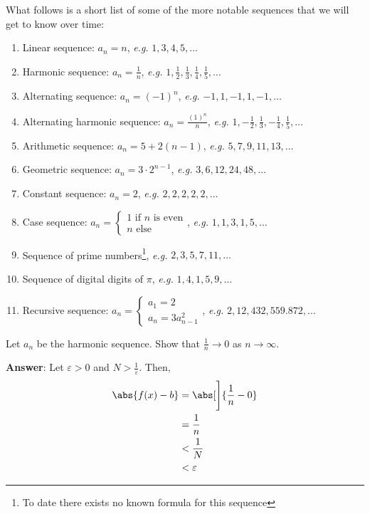 \begin{rem}\label{rem-remarkable-sequences}
	What follows is a short list of some of the more notable sequences that we will
	get to know over time:
	\begin{enumerate}
		\item Linear sequence: $a_n=n$, \textit{e.g.} $1,3,4,5,\dots$
		\item Harmonic sequence: $a_n=\tfrac{1}{n}$, \textit{e.g.} $1,\tfrac{1}{2},\tfrac{1}{3},\tfrac{1}{4},\tfrac{1}{5},\dots$
		\item Alternating sequence: $a_n=(-1)^n$, \textit{e.g.} $-1,1,-1,1,-1,\dots$
		\item Alternating harmonic sequence: $a_n=\tfrac{(1)^{n}}{n}$, \textit{e.g.} $1,-\tfrac{1}{2},\tfrac{1}{3},-\tfrac{1}{4},\tfrac{1}{5},\dots$
		\item Arithmetic sequence: $a_n=5+2(n-1)$, \textit{e.g.} $5,7,9,11,13,\dots$
		\item Geometric sequence: $a_n=3\cdot2^{n-1}$, \textit{e.g.} $3,6,12,24,48,\dots$
		\item Constant sequence: $a_n=2$, \textit{e.g.} $2,2,2,2,2,\dots$
		\item Case sequence: $a_n=\begin{cases}1\text{ if }n\text{ is even}\\n\text{ else}\end{cases}$, \textit{e.g.} $1,1,3,1,5,\dots$
		\item Sequence of prime numbers\footnote{To date there exists no known formula for this sequence}, \textit{e.g.} $2,3,5,7,11,\dots$
		\item Sequence of digital digits of $\pi$, \textit{e.g.} $1,4,1,5,9,\dots$
		\item Recursive sequence: $a_n=\begin{cases}a_1=2\\a_n=3a_{n-1}^2\end{cases}$, \textit{e.g.} $2,12,432,559.872,\dots$
	\end{enumerate}
\end{rem}

\begin{exm}\label{exm-harmonic-sequence}
	Let $a_n$ be the harmonic sequence. Show that $\tfrac{1}{n}\to0$ as $n\to\infty$.
	\begin{flushleft}
		\textbf{Answer}: Let $\varepsilon>0$ and $N>\tfrac{1}{\varepsilon}$. Then,
		\begin{align*}
			\abs{f(x) - b} & = \abs[\Bigg]{\frac{1}{n}-0} \\
			               & = \frac{1}{n}                \\
			               & < \frac{1}{N}                \\
			               & < \varepsilon
		\end{align*}
	\end{flushleft}
\end{exm}

